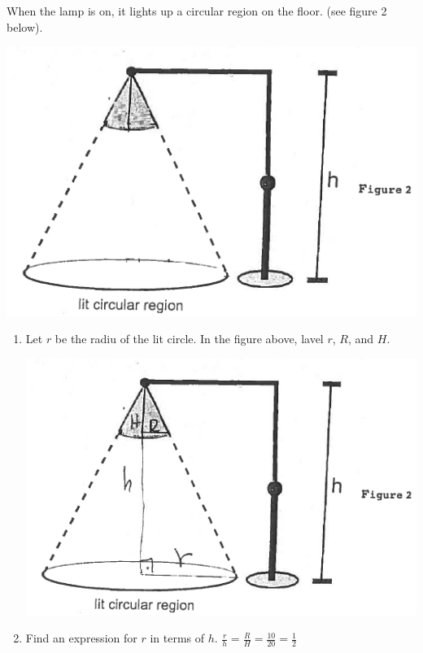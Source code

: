 \documentclass[nooutcomes]{ximera}
\begin{document}
\begin{problem}
When the lamp is on, it lights up a circular region on the floor.  (see figure 2 below).
		\begin{image}
		\includegraphics[scale=.5]{Figure15.png}
		\end{image}
\begin{enumerate}
	\item Let $r$ be the radiu of the lit circle.  In the figure above, lavel $r$, $R$, and $H$.
		\begin{freeResponse} \hfil
		\begin{image}
		\includegraphics[scale=.5]{Figure16.png}
		\end{image}
		\end{freeResponse}	
	\item Find an expression for $r$ in terms of $h$.
	$\frac{r}{h}=\frac{R}{H}=\frac{10}{20}=\frac{1}{2}$
	

\end{enumerate}
\end{problem}
\end{document}
